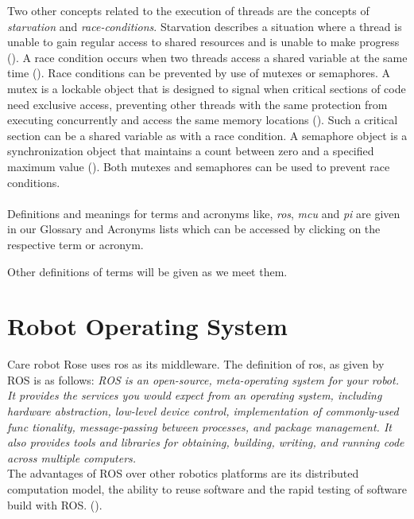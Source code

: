 \documentclass[12pt]{scrreprt}
\begin{document}
\par
Two other concepts related to the execution of threads are the concepts of \textit{starvation} and \textit{race-conditions}. Starvation describes a situation where a thread is unable to gain regular access to shared resources and is unable to make progress (\cite{livelock_starvation}). A race condition occurs when two threads access a shared variable at the same time (\cite{race_condition}). Race conditions can be prevented by use of mutexes or semaphores. A mutex is a lockable object that is designed to signal when critical sections of code need exclusive access, preventing other threads with the same protection from executing concurrently and access the same memory locations (\cite{mutex}). Such a critical section can be a shared variable as with a race condition. A semaphore object is a synchronization object that maintains a count between zero and a specified maximum value (\cite{semaphore}). Both mutexes and semaphores can be used to prevent race conditions.
\\\\
Definitions and meanings for terms and acronyms like, \textit{\acrshort{ros}}, \textit{\acrshort{mcu}} and \textit{\acrshort{pi}} are given in our Glossary and Acronyms lists which can be accessed by clicking on the respective term or acronym.
\par
Other definitions of terms will be given as we meet them.
    

\section{Robot Operating System}
\label{tROS}
Care robot Rose uses \acrfull{ros} as its middleware. The definition of \acrfull{ros}, as given by ROS \cite{ros_wiki_introducton} is as follows:
\textit{ROS is an open-source, meta-operating system for your robot. It provides the services you would expect from an operating system, including hardware abstraction, low-level device control, implementation of commonly-used func tionality, message-passing between processes, and package management. It also provides tools and libraries for obtaining, building, writing, and running code across multiple computers.}\\
 The advantages of ROS over other robotics platforms are its distributed computation model, the ability to reuse software and the rapid testing of software build with ROS. (\cite{agitr}).
 
\end{document}

